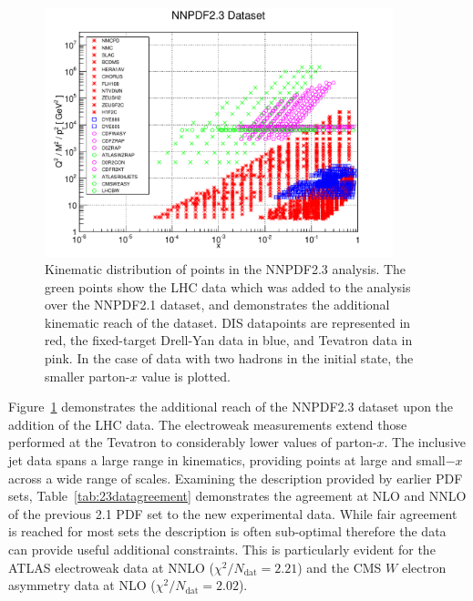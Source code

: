 \begin{figure}[h!]
\centering
\includegraphics[width=0.9\textwidth]{6-LHCimpact/figs/kin23.eps}
\caption[Kinematic distribution of data points in the NNPDF2.3 analysis]{Kinematic distribution of points in the NNPDF2.3 analysis. The green points show the LHC data which was added to the analysis over the NNPDF2.1 dataset, and demonstrates the additional kinematic reach of the dataset. DIS datapoints are represented in red, the fixed-target Drell-Yan data in blue, and Tevatron data in pink. In the case of data with two hadrons in the initial state, the smaller parton-$x$ value is plotted.}
\label{fig:kin23}
\end{figure}



Figure~\ref{fig:kin23} demonstrates the additional reach of the NNPDF2.3 dataset upon the addition of the LHC data. The electroweak measurements extend those performed at the Tevatron to considerably lower values of parton-$x$. The inclusive jet data spans a large range in kinematics, providing points at large and small$-x$  across a wide range of scales. Examining the description provided by earlier PDF sets, Table~\ref{tab:23datagreement} demonstrates the agreement at NLO and NNLO of the previous 2.1 PDF set to the new experimental data. While fair agreement is reached for most sets the description is often sub-optimal therefore the data can provide useful additional constraints. This is particularly evident for the ATLAS electroweak data at NNLO ($\chi^2/N_{\text{dat}} = 2.21$) and the CMS $W$ electron asymmetry data at NLO ($\chi^2/N_{\text{dat}} = 2.02$).

